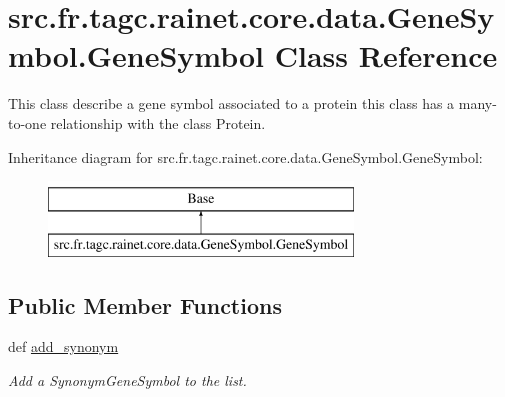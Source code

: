 \hypertarget{classsrc_1_1fr_1_1tagc_1_1rainet_1_1core_1_1data_1_1GeneSymbol_1_1GeneSymbol}{\section{src.\-fr.\-tagc.\-rainet.\-core.\-data.\-Gene\-Symbol.\-Gene\-Symbol Class Reference}
\label{classsrc_1_1fr_1_1tagc_1_1rainet_1_1core_1_1data_1_1GeneSymbol_1_1GeneSymbol}
}


This class describe a gene symbol associated to a protein this class has a many-\/to-\/one relationship with the class Protein.  


Inheritance diagram for src.\-fr.\-tagc.\-rainet.\-core.\-data.\-Gene\-Symbol.\-Gene\-Symbol\-:\begin{figure}[H]
\begin{center}
\leavevmode
\includegraphics[height=2.000000cm]{classsrc_1_1fr_1_1tagc_1_1rainet_1_1core_1_1data_1_1GeneSymbol_1_1GeneSymbol}
\end{center}
\end{figure}
\subsection*{Public Member Functions}
\begin{DoxyCompactItemize}
\item 
\hypertarget{classsrc_1_1fr_1_1tagc_1_1rainet_1_1core_1_1data_1_1GeneSymbol_1_1GeneSymbol_a65846cbf33fbd102348042e83077ad85}{def \hyperlink{classsrc_1_1fr_1_1tagc_1_1rainet_1_1core_1_1data_1_1GeneSymbol_1_1GeneSymbol_a65846cbf33fbd102348042e83077ad85}{add\-\_\-synonym}}\label{classsrc_1_1fr_1_1tagc_1_1rainet_1_1core_1_1data_1_1GeneSymbol_1_1GeneSymbol_a65846cbf33fbd102348042e83077ad85}

\begin{DoxyCompactList}\small\item\em Add a Synonym\-Gene\-Symbol to the list. \end{DoxyCompactList}\end{DoxyCompactItemize}
